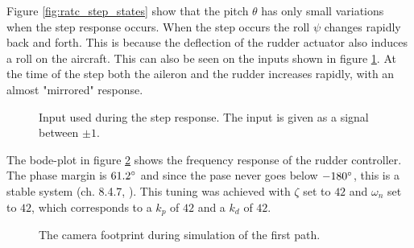 Figure \ref{fig:ratc_step_states} show that the pitch $\theta$ has only small variations when the step response occurs. When the step occurs the roll $\psi$ changes rapidly back and forth. This is because the deflection of the rudder actuator also induces a roll on the aircraft. This can also be seen on the inputs shown in figure \ref{fig:ratc_step_input}. At the time of the step both the aileron and the rudder increases rapidly, with an almost "mirrored" response.

\begin{figure}[]
    \centering
    \caption{Input used during the step response. The input is given as a signal between $\pm1$.}
	\label{fig:ratc_step_input}
\end{figure}

The bode-plot in figure \ref{fig:ratc_bode} shows the frequency response of the rudder controller. The phase margin is $61.2\degree$ and since the pase never goes below $-180\degree$, this is a stable system (ch. 8.4.7, \cite{regBALCHEN}). This tuning was achieved with $\zeta$ set to $42$ and $\omega_n$ set to $42$, which corresponds to a $k_p$ of $42$ and a $k_d$ of $42$.

\begin{figure}[]
    \centering
    \caption{The camera footprint during simulation of the first path.}
	\label{fig:ratc_bode}
\end{figure}


